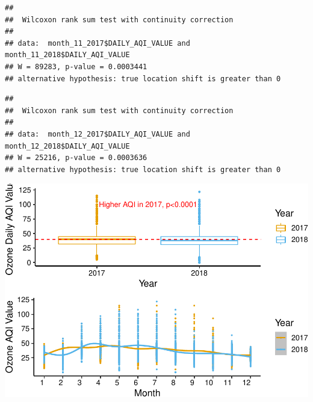 \documentclass[12pt,]{article}
\newenvironment{Shaded}{\begin{snugshade}}{\end{snugshade}}
\newcommand{\KeywordTok}[1]{\textcolor[rgb]{0.13,0.29,0.53}{\textbf{#1}}}
\newcommand{\DataTypeTok}[1]{\textcolor[rgb]{0.13,0.29,0.53}{#1}}
\newcommand{\DecValTok}[1]{\textcolor[rgb]{0.00,0.00,0.81}{#1}}
\newcommand{\StringTok}[1]{\textcolor[rgb]{0.31,0.60,0.02}{#1}}
\newcommand{\OperatorTok}[1]{\textcolor[rgb]{0.81,0.36,0.00}{\textbf{#1}}}
\newcommand{\NormalTok}[1]{#1}
\begin{document}
\begin{Shaded}
\end{Shaded}

\begin{verbatim}
## 
##  Wilcoxon rank sum test with continuity correction
## 
## data:  month_11_2017$DAILY_AQI_VALUE and month_11_2018$DAILY_AQI_VALUE
## W = 89283, p-value = 0.0003441
## alternative hypothesis: true location shift is greater than 0
\end{verbatim}

\begin{Shaded}
\end{Shaded}

\begin{verbatim}
## 
##  Wilcoxon rank sum test with continuity correction
## 
## data:  month_12_2017$DAILY_AQI_VALUE and month_12_2018$DAILY_AQI_VALUE
## W = 25216, p-value = 0.0003636
## alternative hypothesis: true location shift is greater than 0
\end{verbatim}

\includegraphics{Xia_ENV_872_Project_files/figure-latex/Final visualization 1-1.pdf}
\pagebreak
\end{document}
